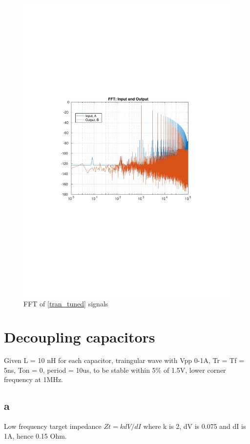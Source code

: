 \documentclass[12pt,a4paper,UKenglish]{article}
\begin{document}
\begin{figure} [htbp]
  \centering 
  \includegraphics[width=\textwidth]{img/2c_fft.pdf} 
  \caption{FFT of \ref{tran_tuned} signals}
  \label{fft_tuned} 
\end{figure}

\section{Decoupling capacitors}
Given L = 10 nH for each capacitor, traingular wave with Vpp 0-1A, Tr = Tf = 5ns, Ton = 0, period = 10us, to be stable within 5\% of 1.5V, lower corner frequency at 1MHz. 
\subsection{a}
Low frequency target impedance $Zt= k dV/dI$ where k is 2, dV is 0.075 and dI is 1A, hence 0.15 Ohm.
\end{document}
